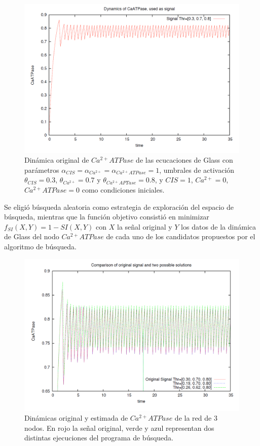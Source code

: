 \begin{figure}[hbt]
\includegraphics[width=0.9\linewidth]{gfx/original3Nodos}
\caption[Dinámica original $Ca^{2+}ATPase$]{Dinámica original de $Ca^{2+}ATPase$ de las ecucaciones de Glass con parámetros $\alpha_{CIS} = \alpha_{Ca^{2+}} =  \alpha_{Ca^{2+}ATPase} = 1$, umbrales de activación $\theta_{CIS} = 0.3$, $\theta_{Ca^{2+}} = 0.7$ y $\theta_{Ca^{2+}APTase} = 0.8$, y $CIS = 1$, $Ca^{2+} = 0$, $Ca^{2+}ATPase = 0$ como condiciones iniciales.}\label{fig:signal3nodos}
\end{figure}

Se eligió búsqueda aleatoria como estrategia de exploración del espacio de búsqueda, mientras que la función objetivo consistió en minimizar $f_{SI}(X,Y) = 1 -SI(X,Y)$ con $X$ la señal original y $Y$ los datos de la dinámica de Glass del nodo $Ca^{2+}ATPase$ de cada uno de los candidatos propuestos por el algoritmo de búsqueda.

\begin{figure}[hbt]
\includegraphics[width=0.9\linewidth]{gfx/comparacion3Nodos}
\caption[Dinámicas original y estimada $Ca^{2+}ATPase$]{Dinámicas original y estimada de $Ca^{2+}ATPase$ de la red de 3 nodos. En rojo la señal original, verde y azul representan dos distintas ejecuciones del programa de búsqueda.}\label{fig:resultadoChido3Nodos}
\end{figure}

